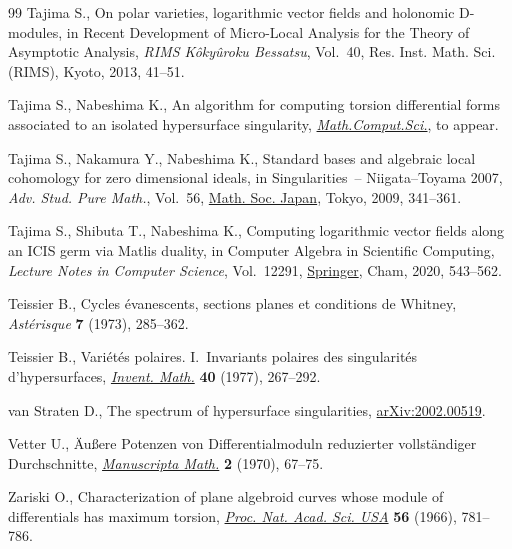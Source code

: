 \documentclass[10pt,a4paper]{amsart}
\numberwithin{equation}{section}
\begin{document}
\begin{thebibliography}{99}
Tajima S., On polar varieties, logarithmic vector fields and holonomic
 {D}-modules, in Recent Development of Micro-Local Analysis for the Theory of
 Asymptotic Analysis, \textit{RIMS K\^oky\^uroku Bessatsu}, Vol.~40, Res.
 Inst. Math. Sci. (RIMS), Kyoto, 2013, 41--51.

Tajima S., Nabeshima K., An algorithm for computing torsion differential forms
 associated to an isolated hypersurface singularity, \href{https://doi.org/10.1007/s11786-020-00486-w}{\textit{Math.Comput.Sci.}},
 {t}o appear.

Tajima S., Nakamura Y., Nabeshima K., Standard bases and algebraic local
 cohomology for zero dimensional ideals, in Singularities~--
 {N}iigata--{T}oyama 2007, \textit{Adv. Stud. Pure Math.}, Vol.~56, \href{https://doi.org/10.2969/aspm/05610341}{Math. Soc.
 Japan}, Tokyo, 2009, 341--361.

Tajima S., Shibuta T., Nabeshima K., Computing logarithmic vector fields along
 an {ICIS} germ via {M}atlis duality, in Computer Algebra in Scientific
 Computing, \textit{Lecture Notes in Computer Science}, Vol.~12291, \href{https://doi.org/10.1007/978-3-030-60026-6_32}{Springer},
 Cham, 2020, 543--562.

Teissier B., Cycles \'evanescents, sections planes et conditions de {W}hitney,
 \textit{Ast\'erisque} \textbf{7} (1973), 285--362.

Teissier B., Vari\'et\'es polaires. {I}.~{I}nvariants polaires des
 singularit\'es d'hypersurfaces, \href{https://doi.org/10.1007/BF01425742}{\textit{Invent. Math.}} \textbf{40} (1977),
 267--292.

van Straten D., The spectrum of hypersurface singularities,
 \href{https://arxiv.org/abs/2002.00519}{arXiv:2002.00519}.

Vetter U., \"Au{\ss}ere {P}otenzen von {D}ifferentialmoduln reduzierter
 vollst\"andiger {D}urchschnitte, \href{https://doi.org/10.1007/BF01168480}{\textit{Manuscripta Math.}} \textbf{2}
 (1970), 67--75.

Zariski O., Characterization of plane algebroid curves whose module of
 differentials has maximum torsion, \href{https://doi.org/10.1073/pnas.56.3.781}{\textit{Proc. Nat. Acad. Sci. USA}}
 \textbf{56} (1966), 781--786.

\end{thebibliography}
\end{document}
